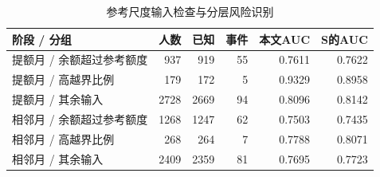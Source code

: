 \begin{table}[H]\centering\caption{参考尺度输入检查与分层风险识别}
\fontsize{9bp}{12bp}\selectfont
\begin{tabularx}{\linewidth}{@{}Yrrrrr@{}}\toprule
阶段 / 分组 & 人数 & 已知 & 事件 & 本文AUC & S的AUC\\\midrule
提额月 / 余额超过参考额度 & 937 & 919 & 55 & 0.7611 & 0.7622\\
提额月 / 高越界比例 & 179 & 172 & 5 & 0.9329 & 0.8958\\
提额月 / 其余输入 & 2728 & 2669 & 94 & 0.8096 & 0.8142\\
相邻月 / 余额超过参考额度 & 1268 & 1247 & 62 & 0.7503 & 0.7435\\
相邻月 / 高越界比例 & 268 & 264 & 7 & 0.7788 & 0.8071\\
相邻月 / 其余输入 & 2409 & 2359 & 81 & 0.7695 & 0.7723\\
\bottomrule\end{tabularx}
\end{table}